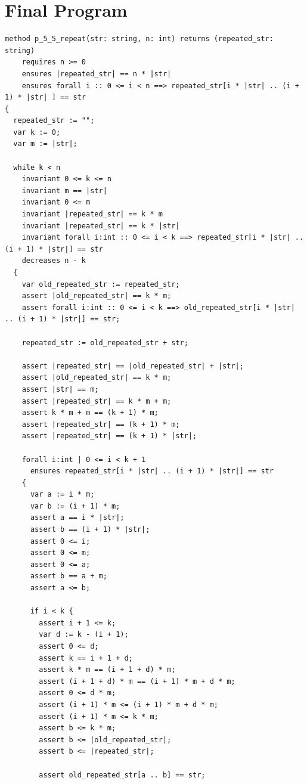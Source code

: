 \documentclass{article}
\begin{document}
\section*{Final Program}
\begin{lstlisting}
method p_5_5_repeat(str: string, n: int) returns (repeated_str: string)
	requires n >= 0
	ensures |repeated_str| == n * |str|
	ensures forall i :: 0 <= i < n ==> repeated_str[i * |str| .. (i + 1) * |str| ] == str
{
  repeated_str := "";
  var k := 0;
  var m := |str|;

  while k < n
    invariant 0 <= k <= n
    invariant m == |str|
    invariant 0 <= m
    invariant |repeated_str| == k * m
    invariant |repeated_str| == k * |str|
    invariant forall i:int :: 0 <= i < k ==> repeated_str[i * |str| .. (i + 1) * |str|] == str
    decreases n - k
  {
    var old_repeated_str := repeated_str;
    assert |old_repeated_str| == k * m;
    assert forall i:int :: 0 <= i < k ==> old_repeated_str[i * |str| .. (i + 1) * |str|] == str;

    repeated_str := old_repeated_str + str;

    assert |repeated_str| == |old_repeated_str| + |str|;
    assert |old_repeated_str| == k * m;
    assert |str| == m;
    assert |repeated_str| == k * m + m;
    assert k * m + m == (k + 1) * m;
    assert |repeated_str| == (k + 1) * m;
    assert |repeated_str| == (k + 1) * |str|;

    forall i:int | 0 <= i < k + 1
      ensures repeated_str[i * |str| .. (i + 1) * |str|] == str
    {
      var a := i * m;
      var b := (i + 1) * m;
      assert a == i * |str|;
      assert b == (i + 1) * |str|;
      assert 0 <= i;
      assert 0 <= m;
      assert 0 <= a;
      assert b == a + m;
      assert a <= b;

      if i < k {
        assert i + 1 <= k;
        var d := k - (i + 1);
        assert 0 <= d;
        assert k == i + 1 + d;
        assert k * m == (i + 1 + d) * m;
        assert (i + 1 + d) * m == (i + 1) * m + d * m;
        assert 0 <= d * m;
        assert (i + 1) * m <= (i + 1) * m + d * m;
        assert (i + 1) * m <= k * m;
        assert b <= k * m;
        assert b <= |old_repeated_str|;
        assert b <= |repeated_str|;

        assert old_repeated_str[a .. b] == str;


\end{lstlisting}
\end{document}
